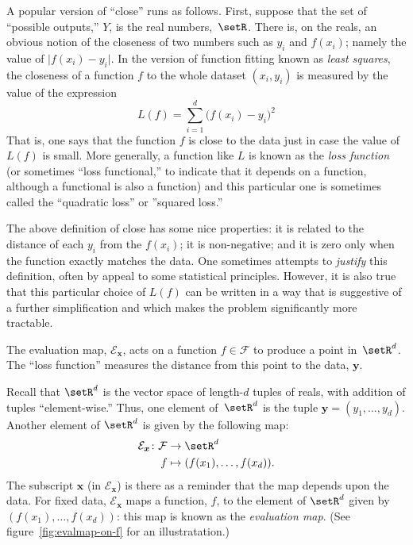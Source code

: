 \documentclass[10pt, a4paper]{article}
\newcommand{\evalmap}{\mathcal{E}_{\bm{x}}}
\begin{document}
A popular version of “close” runs as follows. First, suppose that the
set of “possible outputs,” $Y$, is the real
numbers,~$\setR$. There is, on the reals, an obvious
notion of the closeness of two numbers such as $y_i$ and $f(x_i)$;
namely the value of $\lvert f(x_i)-y_i\rvert$. In the version of
function fitting known as \emph{least squares}, the closeness of a
function $f$ to the whole dataset $(x_i, y_i)$ is measured by the
value of the expression
\begin{equation}
  \label{eq:least-squares-loss}
  L(f) = \sum_{i=1}^d {\bigl(f(x_i)-y_i\bigr)}^2  
\end{equation}
That is, one says that the function $f$ is close to the data just in
case the value of $L(f)$ is small. More generally, a function like $L$
is known as the \emph{loss function} (or sometimes “loss functional,”
to indicate that it depends on a function, although a functional is
also a function) and this particular one is sometimes called the
“quadratic loss” or ”squared loss.”

The above definition of close has some nice properties: it is related
to the distance of each $y_i$ from the $f(x_i)$; it is non-negative;
and it is zero only when the function exactly matches the data. One
sometimes attempts to \emph{justify} this definition, often by appeal
to some statistical principles. However, it is also true that this
particular choice of $L(f)$ can be written in a way that is suggestive
of a further simplification and which makes the problem significantly
more tractable. 

\begin{marginfigure}
  \begin{center}
  \end{center}
  \caption{The evaluation map, $\mathcal{E}_{\bm{x}}$, acts on a function
    $f\in\mathcal{F}$ to produce a point in~$\setR^d$. The “loss function”
    measures the distance from this point to the data, 
    $\bm{y}$.\label{fig:evalmap-on-f}}
\end{marginfigure}
Recall that $\setR^d$ is the vector space of length-$d$ tuples of
reals, with addition of tuples “element-wise.” Thus, one element
of~$\setR^d$ is the tuple $\bm{y}=(y_1,\dotsc,y_d)$. Another element
of $\setR^d$ is given by the following map:
\[
  \begin{aligned}
    \evalmap \colon \mathcal{F} &\to \setR^d \\
    f &\mapsto (f(x_1), \dotsc, f(x_d)).
  \end{aligned}
\]
The subscript $\bm{x}$ (in $\mathcal{E}_{\bm{x}}$) is there as a reminder that
the map depends upon the data. For fixed data, $\mathcal{E}_{\bm{x}}$ maps a
function, $f$, to the element of $\setR^d$ given by
$(f(x_1), \dotsc, f(x_d))$: this map is known as the \emph{evaluation
  map}. (See figure~\ref{fig:evalmap-on-f} for an illustratation.)
\end{document}
